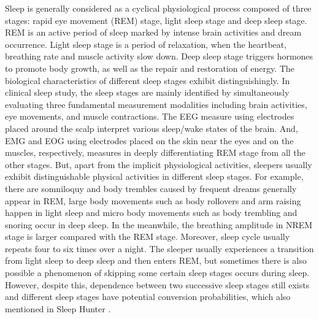 Sleep is generally considered as a cyclical physiological process composed of three stages: rapid eye movement (REM) stage, light sleep stage and deep sleep stage. REM is an active period of sleep marked by intense brain activities and dream occurrence. Light sleep stage is a period of relaxation, when the heartbeat, breathing rate and muscle activity slow down. Deep sleep stage triggers hormones to promote body growth, as well as the repair and restoration of energy.  The biological characteristics of different sleep stages exhibit distinguishingly. In clinical sleep study, the sleep stages are mainly identified by simultaneously evaluating three fundamental measurement modalities including brain activities, eye movements, and muscle contractions. The EEG measure using electrodes placed around the scalp interpret various sleep/wake states of the brain. And, EMG and EOG using electrodes placed on the skin near the eyes and on the muscles, respectively, measures in deeply differentiating REM stage from all the other stages. But, apart from the implicit physiological activities, sleepers usually exhibit distinguishable physical activities in different sleep stages. For example, there are somniloquy and body trembles caused by frequent dreams generally appear in REM, large body movements such as body rollovers and arm raising happen in light sleep and micro body movements such as body trembling and snoring occur in deep sleep.  In the meanwhile, the breathing amplitude in NREM stage is larger compared with the REM stage. Moreover, sleep cycle usually repeats four to six times over a night. The sleeper usually experiences a transition from light sleep to deep sleep and then enters REM, but sometimes there is also possible a phenomenon of skipping some certain sleep stages occurs during sleep. However, despite this, dependence between two successive sleep stages still exists and different sleep stages have potential conversion probabilities, which also mentioned in Sleep Hunter \cite{gu2016sleep}.

